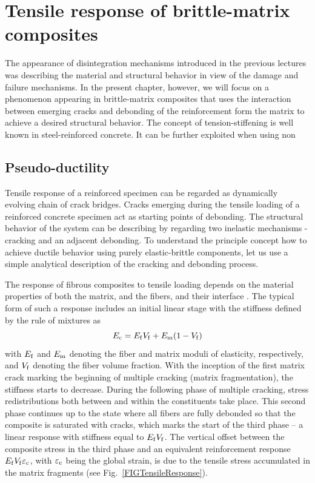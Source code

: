 \documentclass[main.tex]{subfiles}
\begin{document}
\chapter{Tensile response of brittle-matrix composites}
\label{LEC:TensileResponse}

The appearance of disintegration mechanisms introduced in the previous lectures was describing the material and structural behavior in view of the damage and failure mechanisms. In the present chapter, however, we will focus on a phenomenon appearing in brittle-matrix composites that uses the interaction between emerging cracks and debonding of the reinforcement form the matrix to achieve a desired structural behavior. The concept of tension-stiffening is well known in steel-reinforced concrete. It can be further exploited when using non   

\section{Pseudo-ductility}

Tensile response of a reinforced specimen can be regarded as
dynamically evolving chain of crack bridges. 
Cracks emerging during the tensile loading of a reinforced concrete specimen
act as starting points of debonding. The structural behavior of the system
can be describing by regarding two inelastic mechanisms - cracking and 
an adjacent debonding. To understand the principle concept how to achieve ductile behavior 
using purely elastic-brittle components, let us use a simple analytical description
of the cracking and debonding process.

The response of fibrous composites to tensile loading depends on the material properties of both the matrix, and the fibers, and their interface \cite{cox:52,marcoxeva:85,cur:93c}. The typical form of such a response includes an initial linear stage with the stiffness defined by the rule of mixtures as
\begin{equation}
 E_\mathrm{c} = E_\mathrm{f} V_\mathrm{f} + E_\mathrm{m}(1-V_\mathrm{f})
\label{eqn:Ec}
\end{equation}
with $E_\mathrm{f}$ and $E_\mathrm{m}$ denoting the fiber and matrix moduli of elasticity, respectively, and $V_\mathrm{f}$ denoting the fiber volume fraction. With the inception of the first matrix crack marking the beginning of multiple cracking (matrix fragmentation), the stiffness starts to decrease. During the following phase of multiple cracking, stress redistributions both between and within the constituents take place. This second phase continues up to the state where all fibers are fully debonded so that the composite is saturated with cracks, which marks the start of the third phase -- a linear response with stiffness equal to $E_\mathrm{f}V_\mathrm{f}$. The vertical offset between the composite stress in the third phase and an equivalent reinforcement response $E_\mathrm{f}V_\mathrm{f}\varepsilon_\mathrm{c}$, with $\varepsilon_\mathrm{c}$ being the global strain, is due to the tensile stress accumulated in the matrix fragments (see Fig.~\ref{FIGTensileResponse}).
\end{document}
